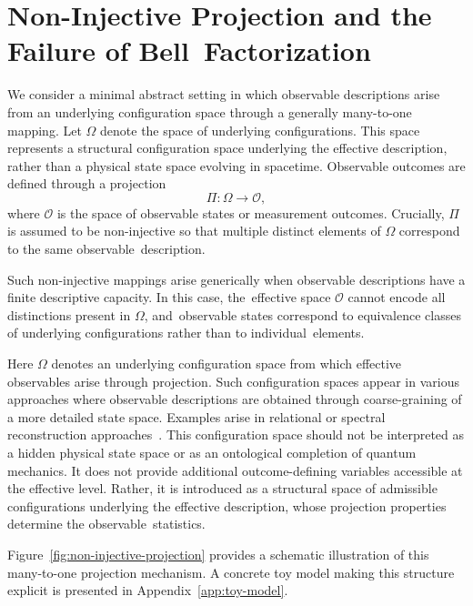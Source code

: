 \documentclass[11pt,a4paper]{article}
\theoremstyle{remark}
\begin{document}
  \section{Non-Injective Projection and the Failure of Bell~Factorization}
    \label{sec:non-injective-projection}

    We consider a minimal abstract setting in which observable descriptions arise from
    an underlying configuration space through a generally many-to-one mapping.
    Let $\Omega$ denote the space of underlying configurations.
    This space represents a structural configuration space underlying the effective
    description, rather than a physical state space evolving in spacetime.
    Observable outcomes are defined through a projection
\begin{equation}
      \Pi : \Omega \rightarrow \mathcal{O},
    \end{equation}
    where $\mathcal{O}$ is the space of observable states or measurement outcomes.
    Crucially, $\Pi$ is assumed to be non-injective so that multiple distinct elements
    of $\Omega$ correspond to the same observable~description.

    Such non-injective mappings arise generically when observable descriptions have
    a finite descriptive capacity.
    In this case, the~effective space $\mathcal{O}$ cannot encode all distinctions
    present in $\Omega$, and~observable states correspond to equivalence classes
    of underlying configurations rather than to individual~elements.

    Here $\Omega$ denotes an underlying configuration space from which
    effective observables arise through projection.
    Such configuration spaces appear in various approaches where observable
    descriptions are obtained through coarse-graining of a more detailed state space.
    Examples arise in relational or spectral reconstruction approaches~\cite{Beau2026a}.
    This configuration space should not be interpreted as a hidden physical state space
    or as an ontological completion of quantum mechanics.
    It does not provide additional outcome-defining variables accessible at the effective level.
    Rather, it is introduced as a structural space of admissible configurations underlying
    the effective description, whose projection properties determine the observable~statistics.

    Figure~\ref{fig:non-injective-projection} provides a schematic illustration of this
    many-to-one projection mechanism.
    A concrete toy model making this structure explicit is presented in Appendix~\ref{app:toy-model}.
\end{document}
